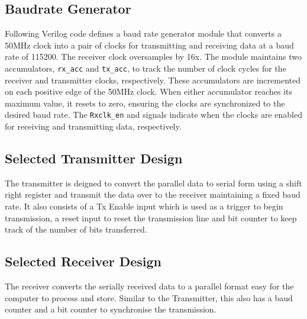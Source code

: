 \documentclass{article}
\begin{document}
                    \subsection{Baudrate Generator}
                        Following Verilog code defines a baud rate generator module that converts a 50MHz clock into a pair of clocks for transmitting and receiving data at a baud rate of 115200. The receiver clock oversamples by 16x. The module maintains two accumulators, \texttt{rx\_acc} and \texttt{tx\_acc}, to track the number of clock cycles for the receiver and transmitter clocks, respectively. These accumulators are incremented on each positive edge of the 50MHz clock. When either accumulator reaches its maximum value, it resets to zero, ensuring the clocks are synchronized to the desired baud rate. The \texttt{Rxclk\_en} and  signals indicate when the clocks are enabled for receiving and transmitting data, respectively.\\

                    

                    \subsection{Selected Transmitter Design}
                    
                        The transmitter is deigned to convert the parallel data to serial form using a shift right register and transmit the data over to the receiver maintaining a fixed baud rate. It also consists of a Tx Enable input which is used as a trigger to begin transmission, a reset input to reset the transmission line and bit counter to keep track of the number of bits transferred.
                        
                        

                    \subsection{Selected Receiver Design}
                        The receiver converts the serially received data to a parallel format easy for the computer to process and store. Similar to the Transmitter, this also has a baud counter and a bit counter to synchronise the transmission.

                        
                        
\end{document}

